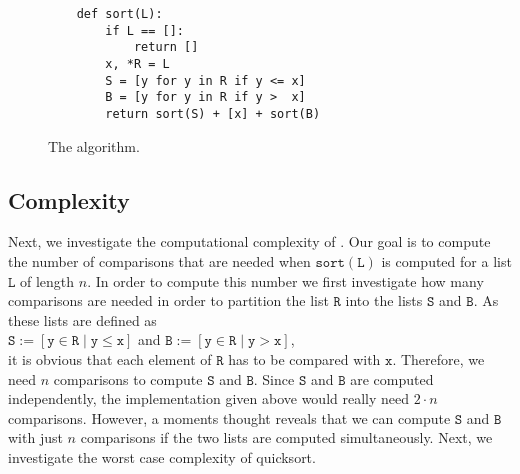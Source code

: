 \begin{figure}[!ht]
  \centering
\begin{verbatim}
    def sort(L):
        if L == []:
            return []
        x, *R = L
        S = [y for y in R if y <= x]
        B = [y for y in R if y >  x]
        return sort(S) + [x] + sort(B)
\end{verbatim}
\vspace*{-0.3cm}
  \caption{The  algorithm.}
  \label{fig:quick-sort.stlx}
\end{figure}

\subsection{Complexity}
Next, we investigate the computational complexity of .
Our goal is to compute the number of comparisons that are needed when
$\mathtt{sort}(\mathtt{L})$ is computed for a list $\mathtt{L}$ of length $n$.  In order to compute this number we
first investigate how many comparisons are needed in order to partition the list $\mathtt{R}$
into the lists $\mathtt{S}$ and $\mathtt{B}$.  As these lists are defined as 
\\[0.2cm]
\hspace*{1.3cm}
 $\mathtt{S} := [\mathtt{y} \in \mathtt{R} \mid \mathtt{y} \leq \mathtt{x}]$ \quad and \quad
 $\mathtt{B} := [\mathtt{y} \in \mathtt{R} \mid \mathtt{y} > \mathtt{x}]$,
\\[0.2cm]
it is obvious that each element of $\mathtt{R}$ has to be compared with $\mathtt{x}$.
Therefore, we need $n$ comparisons to compute $\mathtt{S}$ and $\mathtt{B}$.  Since $\mathtt{S}$ and
$\mathtt{B}$ are computed independently, the implementation given above 
would really need $2 \cdot n$ comparisons.  However, a moments thought reveals that we can compute $\mathtt{S}$ and $\mathtt{B}$
with just $n$ comparisons if the two lists are computed simultaneously.
Next, we investigate the worst case complexity of quicksort.

